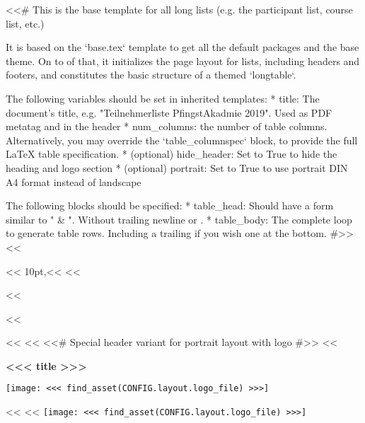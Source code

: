 <<# This is the base template for all long lists (e.g. the participant list, course list, etc.)

    It is based on the `base.tex` template to get all the default packages and the base theme. On to of that, it
    initializes the page layout for lists, including headers and footers, and constitutes the basic structure of a
    themed `longtable`.

    The following variables should be set in inherited templates:
      * title: The document's title, e.g. "Teilnehmerliste PfingstAkadmie 2019". Used as PDF metatag and in the header
      * num_columns: the number of table columns. Alternatively, you may override the `table_columnspec` block, to
        provide the full LaTeX table specification.
      * (optional) hide_header: Set to True to hide the heading and logo section
      * (optional) portrait: Set to True to use portrait DIN A4 format instead of landscape

    The following blocks should be specified:
      * table_head: Should have a form similar to " & ". Without trailing newline
        or \hline.
      * table_body: The complete loop to generate table rows. Including a trailing \hline if you wish one at the bottom.
#>>
<<%


<<%
    10pt,<<%
<<%


<<%
    \geometry{left=1cm,right=1cm}

    \cfoot[]{}
<<%

<<%
    <<%
        \thispagestyle{plain}
        <<# Special header variant for portrait layout with logo #>>
        <<%
            \begin{minipage}[c]{\textwidth-3cm}%
                \headingfamily\bfseries\huge{}<<< title >>>
            \end{minipage}%
            \begin{minipage}[c]{3cm}%
                \texttt{[image: <<< find\_asset(CONFIG.layout.logo\_file) >>>]}
            \end{minipage}
        <<%
            <<%
                \hspace*{\fill}\texttt{[image: <<< find\_asset(CONFIG.layout.logo\_file) >>>]}\\

